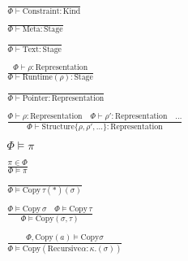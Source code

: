 \documentclass {article}
\begin{document}
\begin{gather*}
\frac
{}
{\Phi \vdash \text{Constraint} : \text{Kind}} \\
\\
\frac
{}
{\Phi \vdash \text{Meta} : \text{Stage}} \\
\\
\frac
{}
{\Phi \vdash \text{Text} : \text{Stage}} \\
\\
\frac
{\Phi \vdash \rho : \text{Representation}}
{\Phi \vdash \text{Runtime} (\rho) : \text{Stage}} \\
\\
\frac
{}
{\Phi \vdash \text{Pointer} : \text{Representation}} \\
\\
\frac
{\Phi \vdash \rho : \text{Representation} \quad \Phi \vdash \rho' : \text{Representation} \quad \dots}
{\Phi \vdash \text{Structure} \{ \rho, \rho', \dots \} : \text{Representation} } \\
\\
\Phi \models \pi \tag*{[Qualified Validation]} \\
\\
\frac
{\pi \in \Phi}
{\Phi \models \pi} \\
\\
\frac
{}
{\Phi \models \text{Copy} \, \tau(*)(\sigma)} \\
\\
\frac
{\Phi \models \text {Copy} \, \sigma \quad \Phi \models \text{Copy} \, \tau}
{\Phi \models \text{Copy} (\sigma, \tau) } \\
\\
\frac
{\Phi, \text{Copy}(a)  \models \text{Copy} \sigma }
{\Phi \models \text{Copy} (\text{Recursive} \alpha : \kappa. (\sigma)) }
\end{gather*}
\end{document}
